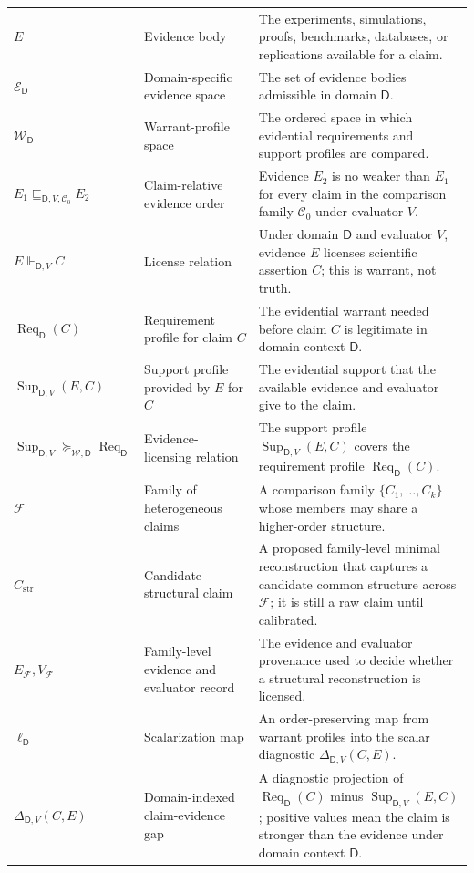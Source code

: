 \documentclass[11pt,a4paper]{article}
\newcommand{\Req}{\operatorname{Req}}
\newcommand{\Sup}{\operatorname{Sup}}
\newcommand{\Dom}{\mathsf{D}}
\begin{document}
{\begin{longtable}{@{}p{2.8cm}p{4.1cm}p{6.4cm}@{}}
$E$ & Evidence body & The experiments, simulations, proofs, benchmarks, databases, or replications available for a claim. \\
$\mathcal{E}_{\Dom}$ & Domain-specific evidence space & The set of evidence bodies admissible in domain $\Dom$. \\
$\mathcal{W}_{\Dom}$ & Warrant-profile space & The ordered space in which evidential requirements and support profiles are compared. \\
$E_1\sqsubseteq_{\Dom,V,\mathcal{C}_0} E_2$ & Claim-relative evidence order & Evidence $E_2$ is no weaker than $E_1$ for every claim in the comparison family $\mathcal{C}_0$ under evaluator $V$. \\
$E\Vdash_{\Dom,V} C$ & License relation & Under domain $\Dom$ and evaluator $V$, evidence $E$ licenses scientific assertion $C$; this is warrant, not truth. \\
$\Req_{\Dom}(C)$ & Requirement profile for claim $C$ & The evidential warrant needed before claim $C$ is legitimate in domain context $\Dom$. \\
$\Sup_{\Dom,V}(E,C)$ & Support profile provided by $E$ for $C$ & The evidential support that the available evidence and evaluator give to the claim. \\
$\Sup_{\Dom,V}\succeq_{\mathcal{W},\Dom}\Req_{\Dom}$ & Evidence-licensing relation & The support profile $\Sup_{\Dom,V}(E,C)$ covers the requirement profile $\Req_{\Dom}(C)$. \\
$\mathcal{F}$ & Family of heterogeneous claims & A comparison family $\{C_1,\ldots,C_k\}$ whose members may share a higher-order structure. \\
$C_{\mathrm{str}}$ & Candidate structural claim & A proposed family-level minimal reconstruction that captures a candidate common structure across $\mathcal{F}$; it is still a raw claim until calibrated. \\
$E_{\mathcal{F}},V_{\mathcal{F}}$ & Family-level evidence and evaluator record & The evidence and evaluator provenance used to decide whether a structural reconstruction is licensed. \\
$\ell_{\Dom}$ & Scalarization map & An order-preserving map from warrant profiles into the scalar diagnostic $\Delta_{\Dom,V}(C,E)$. \\
$\Delta_{\Dom,V}(C,E)$ & Domain-indexed claim-evidence gap & A diagnostic projection of $\Req_{\Dom}(C)$ minus $\Sup_{\Dom,V}(E,C)$; positive values mean the claim is stronger than the evidence under domain context $\Dom$. \\

\end{longtable}}
\end{document}
